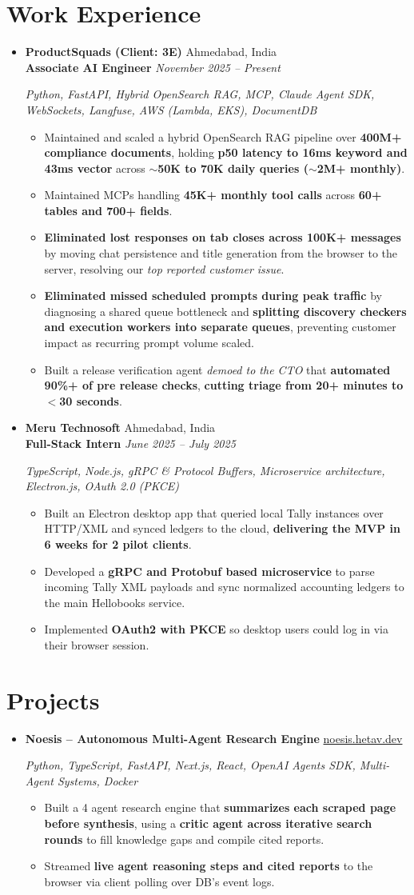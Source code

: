\documentclass[letterpaper,10pt]{article}
\newcommand{\resumeItem}[1]{
	\item\small{#1}
}
\newcommand{\resumeRoleHeading}[5]{
	\vspace{-2pt}\item
	{\textbf{\normalsize #1} \hfill \small #2} \\
	{\textbf{\small #3} \hfill \textit{\small #4}} \\
	\vspace{1pt}
	{\footnotesize\textit{#5}\par}
	\vspace{-2pt}
}
\newcommand{\resumeProjectHeading}[3]{
	\vspace{-2pt}\item
	{\textbf{\normalsize #1} \hfill \small #2} \\
	{\footnotesize\textit{#3}\par}
	\vspace{-2pt}
}
\newcommand{\resumeSubHeadingListStart}{\begin{itemize}[leftmargin=0in, label={}]}
\newcommand{\resumeSubHeadingListEnd}{\end{itemize}\vspace{-4pt}}
\newcommand{\resumeItemListStart}{\begin{itemize}[leftmargin=0.15in, itemsep=2pt, parsep=0pt, topsep=2pt]}
\newcommand{\resumeItemListEnd}{\end{itemize}\vspace{-1pt}}
\begin{document}
	\section{Work Experience}
	\resumeSubHeadingListStart
		\resumeRoleHeading
		{ProductSquads (Client: 3E)}{Ahmedabad, India}
		{Associate AI Engineer}{November 2025 -- Present}
		{Python, FastAPI, Hybrid OpenSearch RAG, MCP, Claude Agent SDK, WebSockets, Langfuse, AWS (Lambda, EKS), DocumentDB}
		\resumeItemListStart
			\resumeItem{Maintained and scaled a hybrid OpenSearch RAG pipeline over \textbf{400M+ compliance documents}, holding \textbf{p50 latency to 16ms keyword and 43ms vector} across \textbf{$\sim$50K to 70K daily queries ($\sim$2M+ monthly)}.}
			\resumeItem{Maintained MCPs handling \textbf{45K+ monthly tool calls} across \textbf{60+ tables and 700+ fields}.}
			\resumeItem{\textbf{Eliminated lost responses on tab closes across 100K+ messages} by moving chat persistence and title generation from the browser to the server, resolving our \textit{top reported customer issue}.}
			\resumeItem{\textbf{Eliminated missed scheduled prompts during peak traffic} by diagnosing a shared queue bottleneck and \textbf{splitting discovery checkers and execution workers into separate queues}, preventing customer impact as recurring prompt volume scaled.}
			\resumeItem{Built a release verification agent \textit{demoed to the CTO} that \textbf{automated 90\%+ of pre release checks}, \textbf{cutting triage from 20+ minutes to $<$30 seconds}.}
		\resumeItemListEnd
		\vspace{5pt}
		\resumeRoleHeading
		{Meru Technosoft}{Ahmedabad, India}
		{Full-Stack Intern}{June 2025 -- July 2025}
		{TypeScript, Node.js, gRPC \& Protocol Buffers, Microservice architecture, Electron.js, OAuth 2.0 (PKCE)}
		\resumeItemListStart
			\resumeItem{Built an Electron desktop app that queried local Tally instances over HTTP/XML and synced ledgers to the cloud, \textbf{delivering the MVP in 6 weeks for 2 pilot clients}.}
			\resumeItem{Developed a \textbf{gRPC and Protobuf based microservice} to parse incoming Tally XML payloads and sync normalized accounting ledgers to the main Hellobooks service.}
			\resumeItem{Implemented \textbf{OAuth2 with PKCE} so desktop users could log in via their browser session.}
		\resumeItemListEnd
	\resumeSubHeadingListEnd

	\section{Projects}
	\resumeSubHeadingListStart
		\resumeProjectHeading
		{Noesis -- Autonomous Multi-Agent Research Engine}{\href{https://noesis.hetav.dev}{noesis.hetav.dev}}
		{Python, TypeScript, FastAPI, Next.js, React, OpenAI Agents SDK, Multi-Agent Systems, Docker}
		\resumeItemListStart
			\resumeItem{Built a 4 agent research engine that \textbf{summarizes each scraped page before synthesis}, using a \textbf{critic agent across iterative search rounds} to fill knowledge gaps and compile cited reports.}
			\resumeItem{Streamed \textbf{live agent reasoning steps and cited reports} to the browser via client polling over DB's event logs.}
		\resumeItemListEnd
	\resumeSubHeadingListEnd
\end{document}
